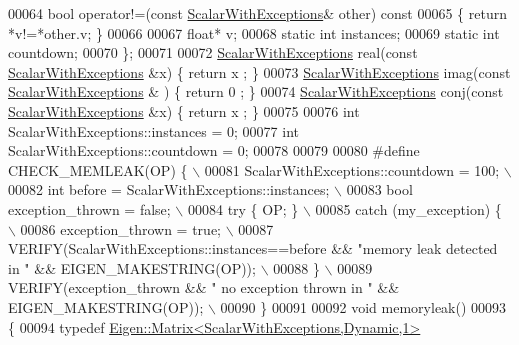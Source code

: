 \begin{DoxyCode}
00064     \textcolor{keywordtype}{bool} operator!=(\textcolor{keyword}{const} \hyperlink{class_scalar_with_exceptions}{ScalarWithExceptions}& other)\textcolor{keyword}{ const}
00065 \textcolor{keyword}{    }\{ \textcolor{keywordflow}{return} *v!=*other.v; \}
00066     
00067     \textcolor{keywordtype}{float}* v;
00068     \textcolor{keyword}{static} \textcolor{keywordtype}{int} instances;
00069     \textcolor{keyword}{static} \textcolor{keywordtype}{int} countdown;
00070 \};
00071 
00072 \hyperlink{class_scalar_with_exceptions}{ScalarWithExceptions} real(\textcolor{keyword}{const} \hyperlink{class_scalar_with_exceptions}{ScalarWithExceptions} &x) \{ \textcolor{keywordflow}{return} x
      ; \}
00073 \hyperlink{class_scalar_with_exceptions}{ScalarWithExceptions} imag(\textcolor{keyword}{const} \hyperlink{class_scalar_with_exceptions}{ScalarWithExceptions} & ) \{ \textcolor{keywordflow}{return} 0
      ; \}
00074 \hyperlink{class_scalar_with_exceptions}{ScalarWithExceptions} conj(\textcolor{keyword}{const} \hyperlink{class_scalar_with_exceptions}{ScalarWithExceptions} &x) \{ \textcolor{keywordflow}{return} x
      ; \}
00075 
00076 \textcolor{keywordtype}{int} ScalarWithExceptions::instances = 0;
00077 \textcolor{keywordtype}{int} ScalarWithExceptions::countdown = 0;
00078 
00079 
00080 \textcolor{preprocessor}{#define CHECK\_MEMLEAK(OP) \{                                 \(\backslash\)}
00081 \textcolor{preprocessor}{    ScalarWithExceptions::countdown = 100;                  \(\backslash\)}
00082 \textcolor{preprocessor}{    int before = ScalarWithExceptions::instances;           \(\backslash\)}
00083 \textcolor{preprocessor}{    bool exception\_thrown = false;                         \(\backslash\)}
00084 \textcolor{preprocessor}{    try \{ OP; \}                              \(\backslash\)}
00085 \textcolor{preprocessor}{    catch (my\_exception) \{                                  \(\backslash\)}
00086 \textcolor{preprocessor}{      exception\_thrown = true;                              \(\backslash\)}
00087 \textcolor{preprocessor}{      VERIFY(ScalarWithExceptions::instances==before && "memory leak detected in " &&
       EIGEN\_MAKESTRING(OP)); \(\backslash\)}
00088 \textcolor{preprocessor}{    \} \(\backslash\)}
00089 \textcolor{preprocessor}{    VERIFY(exception\_thrown && " no exception thrown in " && EIGEN\_MAKESTRING(OP)); \(\backslash\)}
00090 \textcolor{preprocessor}{  \}}
00091 
00092 \textcolor{keywordtype}{void} memoryleak()
00093 \{
00094   \textcolor{keyword}{typedef} \hyperlink{group___core___module_class_eigen_1_1_matrix}{Eigen::Matrix<ScalarWithExceptions,Dynamic,1>} 

\end{DoxyCode}
